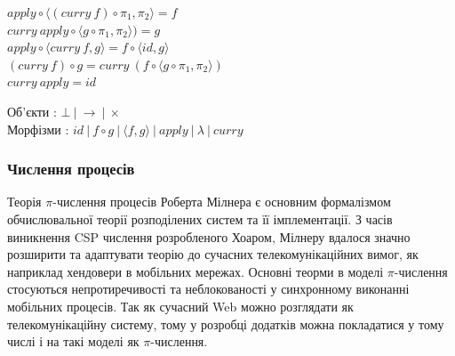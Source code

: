 \documentclass[11pt,oneside]{article}
\begin{document}
\begingroup
\parbox[t][][l]{0.40\textwidth}{

\begin{prooftree}
\end{prooftree}

\begin{prooftree}
\end{prooftree}

\begin{prooftree}
\end{prooftree}

}
\hspace{0.1cm}
\parbox[t][][r]{0.60\textwidth}{


\begin{center}
$apply \circ \langle (curry\ f) \circ \pi_1 , \pi_2 \rangle = f$\\
$curry\ apply \circ \langle g \circ \pi_1, \pi_2 \rangle) = g$\\
$apply \circ \langle curry\ f, g \rangle = f \circ \langle id , g\rangle$\\
$(curry\ f) \circ g = curry\ (f \circ \langle g \circ \pi_1,\pi_2\rangle)$\\
$curry\ apply = id$\\
\end{center}

\begin{center}
Об’єкти : $\bot\ |\ \rightarrow\ |\ \times$\\
Морфізми : $id\ |\ f \circ g\ |\ \langle f, g \rangle\ |\ apply\ |\ \lambda\ |\ curry$
\end{center}

}
\endgroup


\newpage
   \subsubsection{Числення процесів}
   Теорія $\pi$-числення процесів Роберта Мілнера є основним формалізмом обчислювальної
   теорії розподілених систем та її імплементації. З часів виникнення CSP числення розробленого Хоаром,
   Мілнеру вдалося значно розширити та адаптувати теорію до сучасних
   телекомунікаційних вимог, як наприклад хендовери в мобільних мережах.
   Основні теорми в моделі $\pi$-числення стосуються непротиречивості та неблокованості
   у синхронному виконанні мобільних процесів. Так як сучасний Web можно розглядати
   як телекомунікаційну систему, тому у розробці додатків можна покладатися у тому
   числі і на такі моделі як $\pi$-числення.
\end{document}
